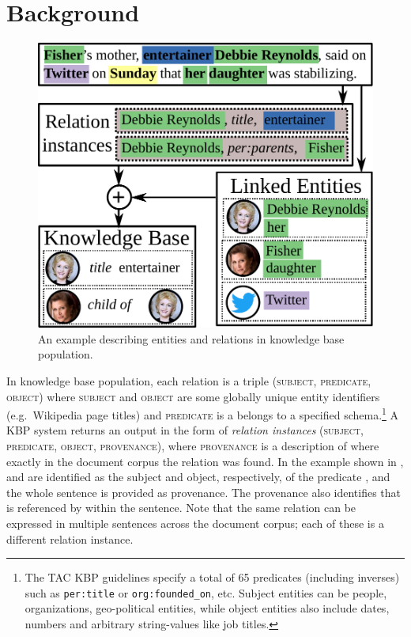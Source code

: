 \section{Background}
\label{sec:setup}
\begin{figure}[t]
  \centering
  \includegraphics[width=0.9\columnwidth]{figures/entities-example.pdf}
  \caption{\label{fig:example} An example describing entities and relations in knowledge base population.}
\end{figure}

In knowledge base population,
  each relation is a triple (\textsc{subject}, \textsc{predicate}, \textsc{object}) where \textsc{subject} and \textsc{object} are some globally unique entity identifiers (e.g.\, Wikipedia page titles) and \textsc{predicate} is a belongs to a specified schema.\footnote{%
    The TAC KBP guidelines specify a total of 65 predicates (including inverses) such as 
     \texttt{per:title} or \texttt{org:founded\_on}, etc.
    Subject entities can be people, organizations, geo-political entities, while object entities also include 
    dates, numbers and arbitrary string-values like job titles.
     }
A KBP system returns an output in the form of \textit{relation instances} (\textsc{subject}, \textsc{predicate}, \textsc{object}, \textsc{provenance}), where \textsc{provenance} is a description of where exactly in the document corpus the relation was found. 
In the example shown in ,
 and  are identified as the subject and object, respectively, of the predicate , and the whole sentence is provided as provenance.
The provenance also identifies that  is referenced by  within the sentence.
Note that the same relation can be expressed in multiple sentences across the document corpus; each of these is a different relation instance.

